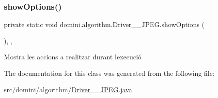\mbox{\label{classdomini_1_1algorithm_1_1Driver____JPEG_a62ce35e061afe893bd03af9bfff41c33}} 
\subsubsection{\texorpdfstring{show\+Options()}{showOptions()}}
{\footnotesize\ttfamily private static void domini.\+algorithm.\+Driver\+\_\+\+\_\+\+J\+P\+E\+G.\+show\+Options (\begin{DoxyParamCaption}{ }\end{DoxyParamCaption})\hspace{0.3cm}{\ttfamily [inline]}, {\ttfamily [static]}, {\ttfamily [private]}}



Mostra les accions a realitzar durant l\textquotesingle{}execució 



The documentation for this class was generated from the following file\+:\begin{DoxyCompactItemize}
\item 
src/domini/algorithm/\hyperlink{Driver____JPEG_8java}{Driver\+\_\+\+\_\+\+J\+P\+E\+G.\+java}\end{DoxyCompactItemize}
